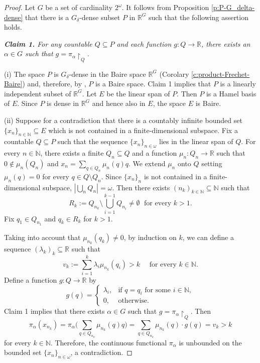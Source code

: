 \documentclass[preprint,11pt]{elsarticle}
\theoremstyle{definition}
\theoremstyle{remark}
\numberwithin{equation}{section}
\numberwithin{theorem}{section}
\newcommand{\w}{\omega}
\newcommand{\NN}{\mathbb{N}}
\newcommand{\IR}{\mathbb{R}}
\newcommand{\SM}{{\setminus}}
\begin{document}
\begin{proof}
Let $G$ be a set of cardinality $2^\omega$. It follows from Proposition \ref{p:P-G_delta-dense} that there is a $G_\delta$-dense subset $P$ in $\IR^G$ such that the following assertion holds.

\smallskip

{\em {\bf Claim 1.} For any countable $Q\subseteq P$ and each function $g: Q\to \IR$, there exists an $\alpha\in G$ such that $g=\pi_\alpha{\restriction}_Q$.}

\smallskip

(i)
The space $P$ is $G_\delta$-dense  in the Baire space $\IR^G$ (Corolary \ref{c:product-Frechet-Baire}) and, therefore, by \cite[Corollary~2.20]{BG-Baire}, $P$ is a Baire space.
Claim 1 implies that $P$ is a linearly independent subset of $\IR^G$. Let $E$ be the linear span of $P$. Then $P$ is a Hamel basis of $E$. Since $P$ is dense in $\IR^G$ and hence also in $E$, the space $E$ is Baire.

\smallskip

(ii) Suppose for a contradiction that there is a countably infinite bounded set $\{x_n\}_{n\in\NN}\subseteq E$ which is not contained in a finite-dimensional subspace. Fix a countable $Q\subseteq P$ such that the sequence $\{x_n\}_{n\in\w}$ lies in the linear span of $Q$. For every $n\in\NN$, there exists a finite $Q_n\subseteq Q$ and a function $\mu_n: Q_n\to\IR$ such that $0\notin \mu_n(Q_n)$ and $x_n=\sum_{q\in Q_n}\mu_n(q) q$. We extend $\mu_n$ onto $Q$  setting $\mu_n(q)=0$ for every $q\in Q\SM Q_n$. Since $\{x_n\}_{n}$ is not contained in a finite-dimensional subspace, $|\bigcup_n Q_n|=\w$. Then there exists $(n_k)_{k\in\NN}\subseteq\NN$ such that
\[
R_k :=Q_{n_k}\setminus\bigcup_{i=1}^{k-1} Q_{n_i}\neq \emptyset \; \mbox{ for every $k>1$}.
\]
Fix $q_1\in Q_{n_1}$ and $q_k\in R_k$ for $k>1$.

Taking into account that $\mu_{n_k}(q_k)\neq 0$, by induction on $k$, we can define a sequence $(\lambda_k)_k\subseteq\IR$ such that
\[
v_k := \sum_{i=1}^k \lambda_i \mu_{n_k}(q_i) > k \quad \mbox{ for every $k\in\NN$}.
\]
Define a function $g: Q\to\IR$ by
\[
g(q)=\begin{cases}
\lambda_i,& \text{if }q=q_i\text{ for some }i\in\NN,\\
0, & \text{otherwise}.
\end{cases}
\]
Claim 1 implies that there exists $\alpha\in G$ such that $g=\pi_\alpha{\restriction}_Q$. Then
\[
\pi_\alpha(x_{n_k})=\pi_\alpha\Big( \sum_{q\in Q_{n_k}}\mu_{n_k}(q) q\Big)= \sum_{q\in Q_{n_k}}\mu_{n_k}(q)\cdot g(q) =v_k>k
\]
for every $k\in\NN$. Therefore, the continuous functional $\pi_\alpha$ is unbounded on the bounded set $\{x_n\}_{n\in\w}$, a contradiction.


\end{proof}
\end{document}
